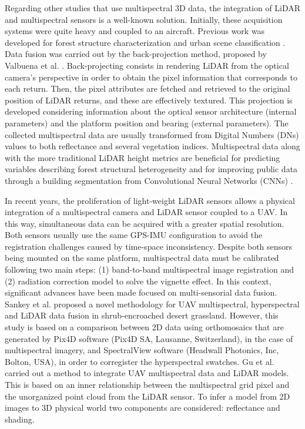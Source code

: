 Regarding other studies that use multispectral 3D data, the integration of LiDAR and multispectral sensors is a well-known solution. Initially, these acquisition systems were quite heavy and coupled to an aircraft. Previous work was developed for forest structure characterization \cite{manzanera_fusion_2016} and urban scene classification \cite{guo_relevance_2011}. Data fusion was carried out by the back-projection method, proposed by Valbuena et al. \cite{valbuena_integrating_2014}. Back-projecting consists in rendering LiDAR from the optical camera’s perspective in order to obtain the pixel information that corresponds to each return. Then, the pixel attributes are fetched and retrieved to the original position of LiDAR returns, and these are effectively textured. This projection is developed considering information about the optical sensor architecture (internal parameters) and the platform position and bearing (external parameters). The collected multispectral data are usually transformed from Digital Numbers (DNs) values to both reflectance and several vegetation indices. Multispectral data along with the more traditional LiDAR height metrics are beneficial for predicting variables describing forest structural heterogeneity \cite{valbuena_most_2018} and for improving public data through a building segmentation from Convolutional Neural Networks (CNNs) \cite{griffiths_improving_2019}. 

In recent years, the proliferation of light-weight LiDAR sensors allows a physical integration of a multispectral camera and LiDAR sensor coupled to a UAV. In this way, simultaneous data can be acquired with a greater spatial resolution. Both sensors usually use the same GPS-IMU configuration to avoid the registration challenges caused by time-space inconsistency. Despite both sensors being mounted on the same platform, multispectral data must be calibrated following two main steps: (1) band-to-band multispectral image registration and (2) radiation correction model to solve the vignette effect. In this context, significant advances have been made focused on multi-sensorial data fusion. Sankey et al. \cite{sankey_quantifying_2021} proposed a novel methodology for UAV multispectral, hyperspectral and LiDAR data fusion in shrub-encroached desert grassland. However, this study is based on a comparison between 2D data using orthomosaics that are generated by Pix4D software (Pix4D SA, Lausanne, Switzerland), in the case of multispectral imagery, and SpectralView software (Headwall Photonics, Inc, Bolton, USA), in order to corregister the hyperspectral swatches. Gu et al. \cite{gu_uav-based_2020} carried out a method to integrate UAV multispectral data and LiDAR models. This is based on an inner relationship between the multispectral grid pixel and the unorganized point cloud from the LiDAR sensor. To infer a model from 2D images to 3D physical world two components are considered: reflectance and shading. 

